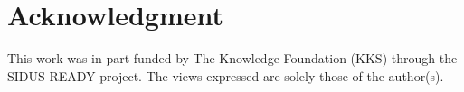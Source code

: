 \documentclass[10pt,conference]{IEEEtran}
\begin{document}
\section*{Acknowledgment}
This work was in part funded by The Knowledge Foundation (KKS) through the SIDUS READY project. The views expressed are solely those of the 
author(s).

\balance



\end{document}
